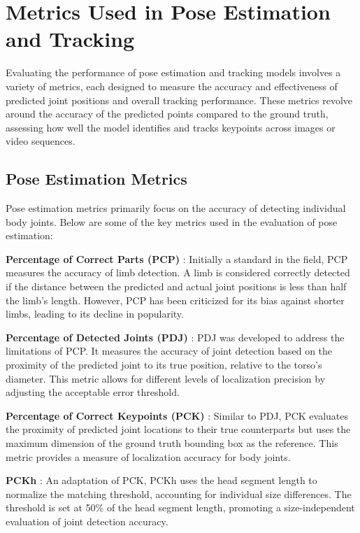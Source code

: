 \section{Metrics Used in Pose Estimation and Tracking}
Evaluating the performance of pose estimation and tracking models involves a
variety of metrics, each designed to measure the accuracy and effectiveness of
predicted joint positions and overall tracking performance. These metrics
revolve around the accuracy of the predicted points compared to the ground
truth, assessing how well the model identifies and tracks keypoints across
images or video sequences.

\subsection{Pose Estimation Metrics}
Pose estimation metrics primarily focus on the accuracy of detecting individual
body joints. Below are some of the key metrics used in the evaluation of pose
estimation:

\textbf{Percentage of Correct Parts (PCP)} \cite{kiefel2014human}: Initially a
standard in the field, PCP measures the accuracy of limb detection. A limb is
considered correctly detected if the distance between the predicted and actual
joint positions is less than half the limb's length. However, PCP has been
criticized for its bias against shorter limbs, leading to its decline in
popularity.

\textbf{Percentage of Detected Joints (PDJ)} \cite{abobakr2016body}: PDJ was
developed to address the limitations of PCP. It measures the accuracy of joint
detection based on the proximity of the predicted joint to its true position,
relative to the torso's diameter. This metric allows for different levels of
localization precision by adjusting the acceptable error threshold.

\textbf{Percentage of Correct Keypoints (PCK)} \cite{gouidis2019accurate}:
Similar to PDJ, PCK evaluates the proximity of predicted joint locations to
their true counterparts but uses the maximum dimension of the ground truth
bounding box as the reference. This metric provides a measure of localization
accuracy for body joints.

\textbf{PCKh} \cite{andriluka20142d}: An adaptation of PCK, PCKh uses the head
segment length to normalize the matching threshold, accounting for individual
size differences. The threshold is set at 50\% of the head segment length,
promoting a size-independent evaluation of joint detection accuracy.

